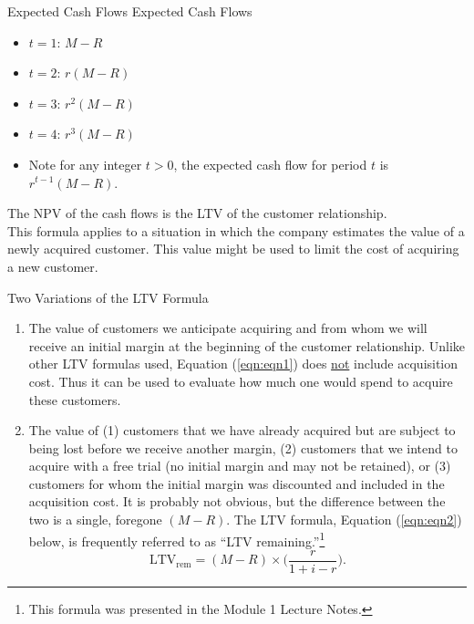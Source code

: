 \documentclass[pdf]{beamer}
\theoremstyle{remark}
\theoremstyle{definition}
\begin{document}
\begin{frame}[t]{Expected Cash Flows}
Expected Cash Flows
\begin{itemize}
  \item $t=1$:  $M-R$
  \item $t=2$:  $r(M-R)$
  \item $t=3$:  $r^2(M-R)$
  \item $t=4$:  $r^3(M-R)$
  \item Note for any integer $t > 0$, the expected cash flow for period $t$ is $r^{t-1}(M-R)$. 
\end{itemize}
The NPV of the cash flows is the LTV of the customer relationship. \\
\vspace{1.5ex}
This formula applies to a situation in which the company estimates the value of a newly acquired customer. This value might be used to limit the cost of acquiring a new customer.
\end{frame}

\begin{frame}[t]{Two Variations of the LTV Formula}
\small
\begin{enumerate}
  \item The value of customers we anticipate acquiring and from whom we will receive an initial margin at the beginning of the customer relationship. Unlike other LTV formulas used, Equation (\ref{eqn:eqn1}) does \underline{not} include acquisition cost. Thus it can be used to evaluate how much one would spend to acquire these customers.
  \item The value of (1) customers that we have already acquired but are subject to being lost before we receive another margin, (2) customers that we intend to acquire with a free trial (no initial margin and may not be retained), or (3) customers for whom the initial margin was discounted and included in the acquisition cost. It is probably not obvious, but the difference between the two is a single, foregone $(M - R)$. The LTV formula, Equation (\ref{eqn:eqn2}) below, is frequently referred to as ``LTV remaining.''\footnote{This formula was presented in the Module 1 Lecture Notes.}
  \begin{equation} \label{eqn:eqn2}
   \text{LTV}_\text{rem} = (M - R) \times \bigg( \frac{r}{1+i-r} \bigg).
  \end{equation}
\end{enumerate}
\end{frame}
\end{document}
